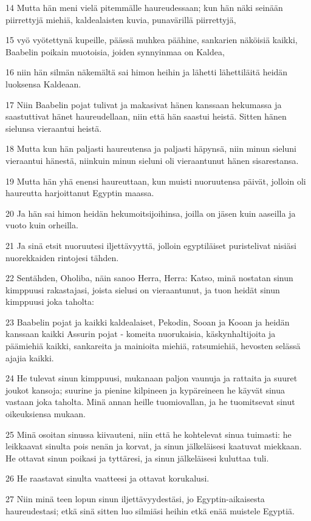 \par 14 Mutta hän meni vielä pitemmälle haureudessaan; kun hän näki seinään piirrettyjä miehiä, kaldealaisten kuvia, punavärillä piirrettyjä,
\par 15 vyö vyötettynä kupeille, päässä muhkea päähine, sankarien näköisiä kaikki, Baabelin poikain muotoisia, joiden synnyinmaa on Kaldea,
\par 16 niin hän silmän näkemältä sai himon heihin ja lähetti lähettiläitä heidän luoksensa Kaldeaan.
\par 17 Niin Baabelin pojat tulivat ja makasivat hänen kanssaan hekumassa ja saastuttivat hänet haureudellaan, niin että hän saastui heistä. Sitten hänen sielunsa vieraantui heistä.
\par 18 Mutta kun hän paljasti haureutensa ja paljasti häpynsä, niin minun sieluni vieraantui hänestä, niinkuin minun sieluni oli vieraantunut hänen sisarestansa.
\par 19 Mutta hän yhä enensi haureuttaan, kun muisti nuoruutensa päivät, jolloin oli haureutta harjoittanut Egyptin maassa.
\par 20 Ja hän sai himon heidän hekumoitsijoihinsa, joilla on jäsen kuin aaseilla ja vuoto kuin orheilla.
\par 21 Ja sinä etsit nuoruutesi iljettävyyttä, jolloin egyptiläiset puristelivat nisiäsi nuorekkaiden rintojesi tähden.
\par 22 Sentähden, Oholiba, näin sanoo Herra, Herra: Katso, minä nostatan sinun kimppuusi rakastajasi, joista sielusi on vieraantunut, ja tuon heidät sinun kimppuusi joka taholta:
\par 23 Baabelin pojat ja kaikki kaldealaiset, Pekodin, Sooan ja Kooan ja heidän kanssaan kaikki Assurin pojat - komeita nuorukaisia, käskynhaltijoita ja päämiehiä kaikki, sankareita ja mainioita miehiä, ratsumiehiä, hevosten selässä ajajia kaikki.
\par 24 He tulevat sinun kimppuusi, mukanaan paljon vaunuja ja rattaita ja suuret joukot kansoja; suurine ja pienine kilpineen ja kypäreineen he käyvät sinua vastaan joka taholta. Minä annan heille tuomiovallan, ja he tuomitsevat sinut oikeuksiensa mukaan.
\par 25 Minä osoitan sinussa kiivauteni, niin että he kohtelevat sinua tuimasti: he leikkaavat sinulta pois nenän ja korvat, ja sinun jälkeläisesi kaatuvat miekkaan. He ottavat sinun poikasi ja tyttäresi, ja sinun jälkeläisesi kuluttaa tuli.
\par 26 He raastavat sinulta vaatteesi ja ottavat korukalusi.
\par 27 Niin minä teen lopun sinun iljettävyydestäsi, jo Egyptin-aikaisesta haureudestasi; etkä sinä sitten luo silmiäsi heihin etkä enää muistele Egyptiä.
